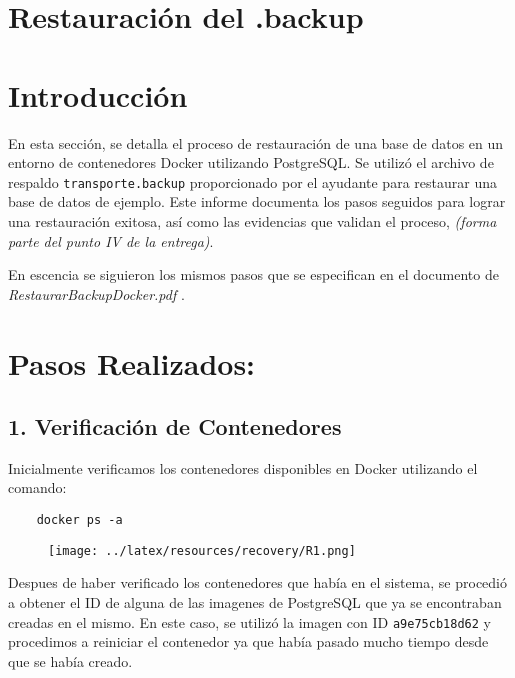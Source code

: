 \section*{\LARGE{Restauración del .backup}}

\section*{Introducción}

En esta sección, se detalla el proceso de restauración de una base de datos en un entorno de contenedores Docker utilizando PostgreSQL. Se utilizó el archivo de respaldo \texttt{transporte.backup} proporcionado por el ayudante para restaurar una base de datos de ejemplo. Este informe documenta los pasos seguidos para lograr una restauración exitosa, así como las evidencias que validan el proceso, \textit{(forma parte del punto IV de la entrega)}. \vspace{0.3cm}

En escencia se siguieron los mismos pasos que se especifican en el documento de \textit{RestaurarBackupDocker.pdf} .

\section*{Pasos Realizados:} 


\subsection*{1. Verificación de Contenedores} 

Inicialmente verificamos los contenedores disponibles en Docker utilizando el comando: \vspace{0.3cm}

\begin{verbatim}
    docker ps -a    
\end{verbatim}


\begin{figure}[H]
    \centering
        \texttt{[image: ../latex/resources/recovery/R1.png]}
    \end{figure}

Despues de haber verificado los contenedores que había en el sistema, se procedió a obtener el ID de alguna de las imagenes de PostgreSQL que ya se encontraban creadas en el mismo. En este caso, se utilizó la imagen con ID \texttt{a9e75cb18d62} y procedimos a reiniciar el contenedor ya que había pasado mucho tiempo desde que se había creado. \vspace{0.3cm}


